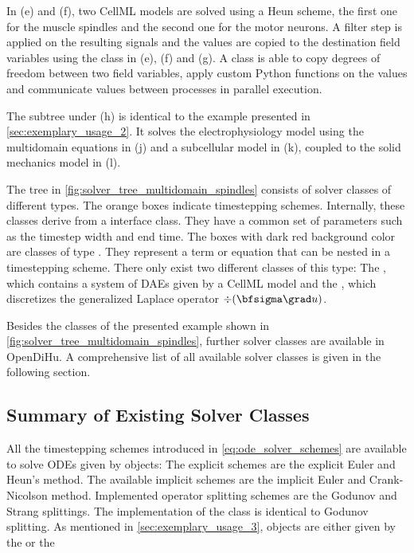 In (e) and (f), two CellML models are solved using a Heun scheme, the first one for the muscle spindles and the second one for the motor neurons. A filter step is applied on the resulting signals and the values are copied to the destination field variables using the  class in (e), (f) and (g). A  class is able to copy degrees of freedom between two field variables, apply custom Python functions on the values and communicate values between processes in parallel execution.

The subtree under (h) is identical to the example presented in \cref{sec:exemplary_usage_2}. It solves the electrophysiology model using the multidomain equations in (j) and a subcellular model in (k), coupled to the solid mechanics model in (l).

The tree in \cref{fig:solver_tree_multidomain_spindles} consists of solver classes of different types. The orange boxes indicate timestepping schemes. Internally, these classes derive from a  interface class. They have a common set of parameters such as the timestep width and end time.
The boxes with dark red background color are classes of type . They represent a term or equation that can be nested in a timestepping scheme. There only exist two different classes of this type: The , which contains a system of DAEs given by a CellML model and the , which discretizes the generalized Laplace operator $\div(\bfsigma \grad u)$.

Besides the classes of the presented example shown in \cref{fig:solver_tree_multidomain_spindles}, further solver classes are available in OpenDiHu. A comprehensive list of all available solver classes is given in the following section.

\subsection{Summary of Existing Solver Classes}\label{sec:summary_of_existing_solver_classes}

All the timestepping schemes introduced in \cref{eq:ode_solver_schemes} are available to solve ODEs given by  objects:
The explicit schemes are the explicit Euler and Heun's method. The available implicit schemes are the implicit Euler and Crank-Nicolson method.
Implemented operator splitting schemes are the Godunov and Strang splittings. The implementation of the  class is identical to Godunov splitting.
As mentioned in \cref{sec:exemplary_usage_3},  objects are either given by the  or the 

